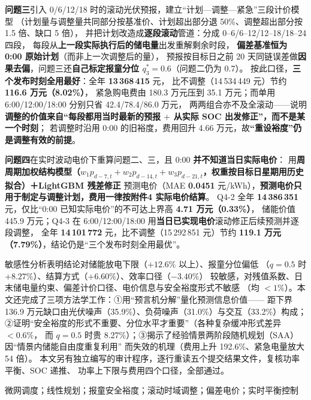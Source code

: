 \documentclass[12pt,a4paper,fontset=fandol]{ctexart}
\newcommand{\cumcmkeywords}[1]{\par\vspace{0.6em}\noindent{\heiti\bfseries 关键词：}#1}
\begin{document}
\textbf{问题三}引入 0/6/12/18 时的滚动光伏预报\nobreak，建立“计划—调整—紧急\nobreak”三段计价模型
（计划量与调整量共同部分按基准价\nobreak、计划超出部分退 50\%\nobreak、调整超出部分按 1.5 倍\nobreak、缺口 5 倍\nobreak）\nobreak，
并把计划改造成\textbf{逐段滚动}管道\nobreak：分成 0--6/6--12/12--18/18--24 四段\nobreak，
每段从\textbf{上一段实际执行后的储电量}出发重解剩余时段\nobreak，
\textbf{偏差基准恒为 0:00 原始计划}（而非上一次调整后的量\nobreak）\nobreak，
预报按目标日之前 20 天同链误差做\textbf{因果去偏}\nobreak，问题三还\textbf{自己标定报童分位 $q_3^*=0.6$}（问题二仍为 0.7\nobreak）\nobreak。
按此口径\nobreak，\textbf{三个发布时刻全用最好}\nobreak：全年 \textbf{13\,368\,415} 元\nobreak，
比不调整（14\,534\,449 元\nobreak）节约 \textbf{116.6 万元（8.02\%\nobreak）}\nobreak，
紧急购电费由 180.3 万元压到 35.1 万元\nobreak；而单用 6:00/12:00/18:00 分别只省 42.4/78.4/86.0 万元\nobreak，
两两组合亦不及全滚动——说明\textbf{调整的价值来自“每段都用当时最新的预报 $+$ 从实际 SOC 出发修正\nobreak”，而不是某一个时刻}\nobreak；
若调整时沿用 0:00 的旧裕度\nobreak，费用回升 4.66 万元\nobreak，故\textbf{“重设裕度\nobreak”仍是调整有效的前提}\nobreak。

\textbf{问题四}在实时波动电价下重算问题二\nobreak、三\nobreak，且 0:00 \textbf{并不知道当日实际电价}：
用\textbf{周周期加权结构模型（$w_1p_{d-7,t}+w_2p_{d-14,t}+w_3p_{d-21,t}$，权重按目标日星期用历史拟合）＋LightGBM 残差修正}
预测电价（MAE \textbf{0.0451} 元/kWh\nobreak），\textbf{预测电价只用于制定与调整计划\nobreak，费用一律按附件4 实际电价结算}\nobreak。
Q4-2 全年 \textbf{14\,386\,351} 元\nobreak，仅比“0:00 已知实际电价\nobreak”的不可达上界高 \textbf{4.71 万元（0.33\%\nobreak）}\nobreak，
储能价值 445.9 万元\nobreak；Q4-3 在 6:00/12:00/18:00 用\textbf{当日已实现电价}滚动修正后续预测并逐段调整\nobreak，
全年 \textbf{14\,101\,772} 元\nobreak，比不调整（15\,292\,851 元\nobreak）节约 \textbf{119.1 万元（7.79\%\nobreak）}\nobreak，结论仍是“三个发布时刻全用最优\nobreak”\nobreak。

敏感性分析表明结论对储能放电下限（$+12.6\text{\%}$ 以上\nobreak）\nobreak、报童分位偏低
（$q=0.5$ 时 $+8.27\text{\%}$\nobreak）\nobreak、结算方式（$+6.60\text{\%}$\nobreak）\nobreak、效率口径（$-3.40\text{\%}$\nobreak）
较敏感\nobreak，对残值系数\nobreak、日末储电量约束\nobreak、偏差计价口径\nobreak、电价信息与安全裕度形式不敏感
（均 $<1\text{\%}$\nobreak）\nobreak。本文还完成了三项方法学工作\nobreak：①用“预言机分解\nobreak”量化预测信息价值——
距下界 136.9 万元缺口由光伏噪声（35.9\%\nobreak）\nobreak、负荷噪声（31.0\%\nobreak）与交互（33.2\%\nobreak）构成\nobreak；
②证明“安全裕度的形式不重要\nobreak、分位水平才重要\nobreak”（各种复杂缓冲形式差异 $<0.6\text{\%}$\nobreak，
而 $q=0.5$ 时贵 8.27\%\nobreak）\nobreak；③揭示了经验情景两阶段随机规划（SAA\nobreak）因“情景内储能自由度重复利用\nobreak”
而失效的机理（费用上升 192.6\%\nobreak、紧急电量放大 54 倍\nobreak）\nobreak。
本文另有独立编写的审计程序\nobreak，逐行重读五个提交结果文件\nobreak，复核功率平衡\nobreak、SOC 递推\nobreak、
功率上下限与费用四个口径\nobreak，全部通过\nobreak。
\cumcmkeywords{微网调度\nobreak；线性规划\nobreak；报童安全裕度\nobreak；滚动时域调整\nobreak；偏差电价\nobreak；实时平衡控制}
\end{document}

